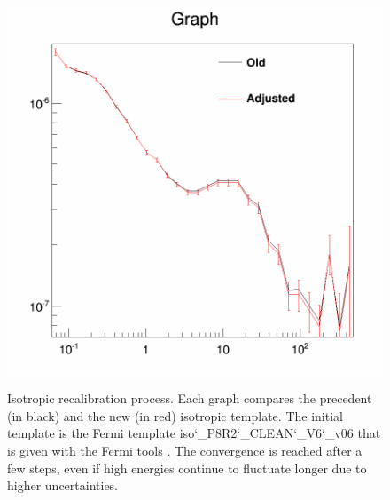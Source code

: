 \begin{figure}[H]
\begin{minipage}[h]{0.45\textwidth}
 	\subcaption{}
  	\label{app:app_iso_process_3}
  \end{minipage}
  \hfill
  \begin{minipage}[h]{0.45\textwidth}
  	\centering
	\includegraphics[width=1\linewidth]{pic/method/app_iso_process_4.png}
  	\subcaption{}
  	\label{app:app_iso_process_4}
  \end{minipage}
  \caption{Isotropic recalibration process. Each graph compares the precedent (in black) and the new (in red) isotropic template. The initial template is the Fermi template iso\char`_P8R2\char`_CLEAN\char`_V6\char`_v06 that is given with the Fermi tools \cite{FermiTools}. The convergence is reached after a few steps, even if high energies continue to fluctuate longer due to higher uncertainties.}
  \label{app:app_iso_process}
\end{figure}
 

